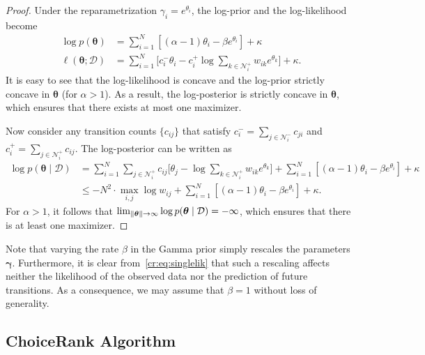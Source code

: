 \begin{proof}
Under the reparametrization $\gamma_i = e^{\theta_i}$, the log-prior and the log-likelihood become
\begin{align*}
\log p(\bm{\theta})
    &= \sum_{i = 1}^N \left[ (\alpha - 1) \theta_i - \beta e^{\theta_i} \right] + \kappa \\
\ell(\bm{\theta} ; \mathcal{D})
    &= \sum_{i = 1}^N \bigg[ c^-_i \theta_i - c^+_i \log \sum_{k \in \mathcal{N}^+_i} w_{ik} e^{\theta_k} \bigg] + \kappa.
\end{align*}
It is easy to see that the log-likelihood is concave and the log-prior strictly concave in $\bm{\theta}$ (for $\alpha > 1$).
As a result, the log-posterior is strictly concave in $\bm{\theta}$, which ensures that there exists at most one maximizer.

Now consider any transition counts $\{ c_{ij} \}$ that satisfy $c^-_i = \sum_{j \in \mathcal{N}^-_i} c_{ji}$ and $c^+_i = \sum_{j \in \mathcal{N}^+_i} c_{ij}$.
The log-posterior can be written as
\begin{align*}
\log p(\bm{\theta} \mid \mathcal{D})
    &= \sum_{i = 1}^N \sum_{j \in \mathcal{N}^+_i} c_{ij} \bigg[ \theta_j - \log \sum_{k \in \mathcal{N}^+_i} w_{ik} e^{\theta_k} \bigg]
       + \sum_{i = 1}^N \left[ (\alpha - 1) \theta_i - \beta e^{\theta_i} \right] + \kappa\\
    &\le -N^2 \cdot \max_{i,j} \log w_{ij}
       + \sum_{i = 1}^N \left[ (\alpha - 1) \theta_i - \beta e^{\theta_i} \right] + \kappa.
\end{align*}
For $\alpha > 1$, it follows that $\lim_{\lVert\bm{\theta}\rVert \to \infty} \log p(\bm{\theta} \mid \mathcal{D}) = -\infty$, which ensures that there is at least one maximizer.
\end{proof}

Note that varying the rate $\beta$ in the Gamma prior simply rescales the parameters $\bm{\gamma}$.
Furthermore, it is clear from~\eqref{cr:eq:singlelik} that such a rescaling affects neither the likelihood of the observed data nor the prediction of future transitions.
As a consequence, we may assume that $\beta = 1$ without loss of generality.

\subsection{ChoiceRank Algorithm}  %
\label{cr:sec:algorithm}

